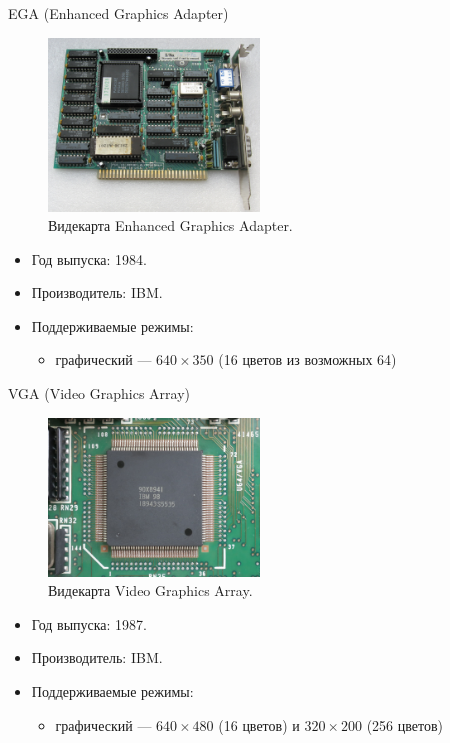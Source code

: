 \documentclass{beamer}
\begin{document}
\begin{frame}{EGA (Enhanced Graphics Adapter)}

\begin{figure}
\center
\includegraphics[width=0.5\textwidth]{Images/EGA_card.jpg}
\caption{\label{fig:EGA}Видекарта Enhanced Graphics Adapter.}
\end{figure}

\begin{itemize}
\item{Год выпуска: 1984.}
\item{Производитель: IBM.}
\item{Поддерживаемые режимы: }

\begin{itemize}
\item{графический --- $640 \times 350$ (16 цветов из возможных 64)}
\end{itemize}

\end{itemize}

\end{frame}

\begin{frame}{VGA (Video Graphics Array)}

\begin{figure}
\center
\includegraphics[width=0.5\textwidth]{Images/IBM_VGA.jpg}
\caption{\label{fig:VGA}Видекарта Video Graphics Array.}
\end{figure}

\begin{itemize}
\item{Год выпуска: 1987.}
\item{Производитель: IBM.}
\item{Поддерживаемые режимы: }

\begin{itemize}
\item{графический --- $640 \times 480$ (16 цветов) и $320 \times 200$ (256 цветов)}
\end{itemize}

\end{itemize}

\end{frame}
\end{document}
